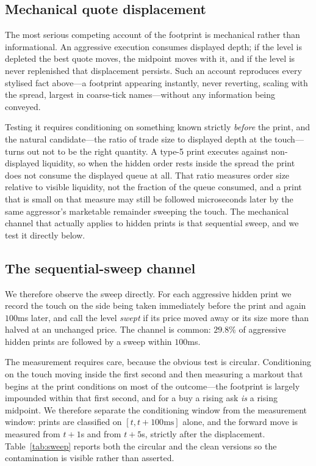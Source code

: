 \documentclass[11pt]{article}
\begin{document}
\subsection{Mechanical quote displacement}
\label{sec:depletion}

The most serious competing account of the footprint is mechanical rather than informational.
An aggressive execution consumes displayed depth; if the level is depleted the best quote
moves, the midpoint moves with it, and if the level is never replenished that displacement
persists. Such an account reproduces every stylised fact above---a footprint appearing
instantly, never reverting, scaling with the spread, largest in coarse-tick names---without
any information being conveyed.

Testing it requires conditioning on something known strictly \emph{before} the print, and the
natural candidate---the ratio of trade size to displayed depth at the touch---turns out not to
be the right quantity. A type-5 print executes against non-displayed liquidity, so when the
hidden order rests inside the spread the print does not consume the displayed queue at all.
That ratio measures order size relative to visible liquidity, not the fraction of the queue
consumed, and a print that is small on that measure may still be followed microseconds later
by the same aggressor's marketable remainder sweeping the touch. The mechanical channel that
actually applies to hidden prints is that sequential sweep, and we test it directly below.

\subsection{The sequential-sweep channel}
\label{sec:sweep}

We therefore observe the sweep directly. For each aggressive hidden print we record the touch
on the side being taken immediately before the print and again $100$ms later, and call the
level \emph{swept} if its price moved away or its size more than halved at an unchanged price.
The channel is common: $29.8\%$ of aggressive hidden prints are followed by a sweep within
$100$ms.

The measurement requires care, because the obvious test is circular. Conditioning on the
touch moving inside the first second and then measuring a markout that begins at the print
conditions on most of the outcome---the footprint is largely impounded within that first
second, and for a buy a rising ask \emph{is} a rising midpoint. We therefore separate the
conditioning window from the measurement window: prints are classified on $[t, t+100\text{ms}]$
alone, and the forward move is measured from $t+1$s and from $t+5$s, strictly after the
displacement. Table~\ref{tab:sweep} reports both the circular and the clean versions so the
contamination is visible rather than asserted.
\end{document}
